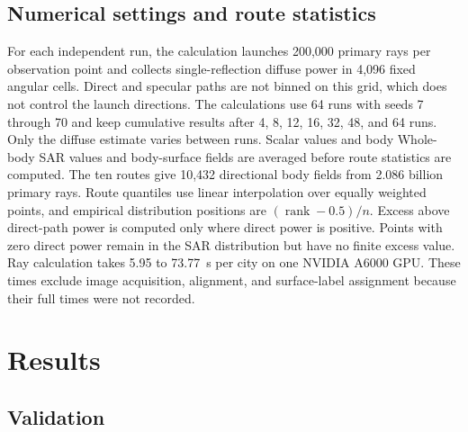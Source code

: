 \documentclass{IEEEoj}
\providecommand{\DIFadd}[1]{{\protect\color{blue} \sf #1}} %
\providecommand{\DIFdel}[1]{{\protect\color{red} \scriptsize #1}} %
\providecommand{\DIFaddbegin}{} %
\providecommand{\DIFaddend}{} %
\providecommand{\DIFdelbegin}{} %
\providecommand{\DIFdelend}{} %
\begin{document}
\subsection{Numerical settings and route statistics}
\label{sec:numerical-settings}

For each independent run, the calculation launches 200,000 primary rays per
observation point and collects single-reflection diffuse power in 4,096 fixed
angular cells. Direct and specular paths are not binned on this grid, which does
not control the launch directions. The calculations use 64 runs with seeds 7
through 70 and keep cumulative results after 4, 8, 12, 16, 32, 48, and 64 runs.
Only the diffuse estimate varies between runs. \DIFdelbegin \DIFdel{Scalar values and body }\DIFdelend \DIFaddbegin \DIFadd{Whole-body SAR values and body-surface }\DIFaddend fields
are averaged before route statistics are computed. The ten routes give 10,432
directional body fields from 2.086 billion primary rays. Route quantiles use
linear interpolation over equally weighted points, and empirical distribution
positions are $(\operatorname{rank}-0.5)/n$. Excess above direct-path power is
computed only where direct power is positive. Points with zero direct power
remain in the SAR distribution but have no finite excess value. Ray calculation
takes 5.95 to 73.77~s per city on one NVIDIA A6000 GPU. These times exclude
image acquisition, alignment, and surface-label assignment because their full
times were not recorded.

\section{Results}
\label{sec:results}

\subsection{Validation}
\label{sec:validation}
\end{document}
